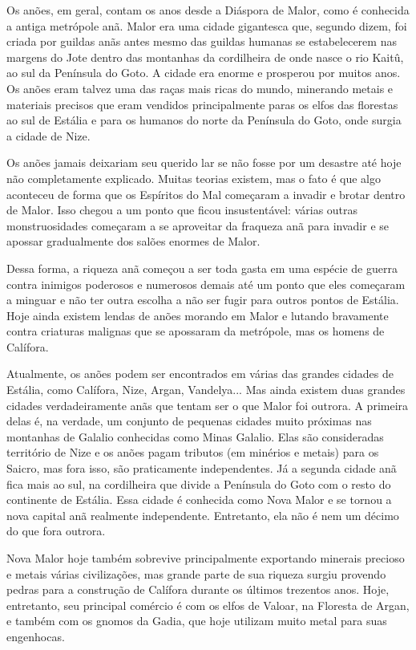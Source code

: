 \documentclass{RPG_Adventure}[2021/10/20]
\begin{document}
Os anões, em geral, contam os anos desde a Diáspora de Malor, como é conhecida a
antiga metrópole anã. Malor era uma cidade gigantesca que, segundo dizem, foi
criada por guildas anãs antes mesmo das guildas humanas se estabelecerem nas
margens do Jote dentro das montanhas da cordilheira de onde nasce o rio Kaitû,
ao sul da Península do Goto. A cidade era enorme e prosperou por muitos anos. Os
anões eram talvez uma das raças mais ricas do mundo, minerando metais e
materiais precisos que eram vendidos principalmente paras os elfos das florestas
ao sul de Estália e para os humanos do norte da Península do Goto, onde surgia a
cidade de Nize.

Os anões jamais deixariam seu querido lar se não fosse por um desastre até hoje
não completamente explicado. Muitas teorias existem, mas o fato é que algo
aconteceu de forma que os Espíritos do Mal começaram a invadir e brotar dentro
de Malor. Isso chegou a um ponto que ficou insustentável: várias outras
monstruosidades começaram a se aproveitar da fraqueza anã para invadir e se
apossar gradualmente dos salões enormes de Malor.

Dessa forma, a riqueza anã começou a ser toda gasta em uma espécie de guerra
contra inimigos poderosos e numerosos demais até um ponto que eles começaram a
minguar e não ter outra escolha a não ser fugir para outros pontos de Estália.
Hoje ainda existem lendas de anões morando em Malor e lutando bravamente contra
criaturas malignas que se apossaram da metrópole, mas os homens de Calífora.

Atualmente, os anões podem ser encontrados em várias das grandes cidades de
Estália, como Calífora, Nize, Argan, Vandelya... Mas ainda existem duas grandes
cidades verdadeiramente anãs que tentam ser o que Malor foi outrora. A primeira
delas é, na verdade, um conjunto de pequenas cidades muito próximas nas
montanhas de Galalio conhecidas como Minas Galalio. Elas são consideradas
território de Nize e os anões pagam tributos (em minérios e metais) para os
Saicro, mas fora isso, são praticamente independentes. Já a segunda cidade anã
fica mais ao sul, na cordilheira que divide a Península do Goto com o resto do
continente de Estália. Essa cidade é conhecida como Nova Malor e se tornou a
nova capital anã realmente independente. Entretanto, ela não é nem um décimo do
que fora outrora.

Nova Malor hoje também sobrevive principalmente exportando minerais precioso e
metais várias civilizações, mas grande parte de sua riqueza surgiu provendo
pedras para a construção de Calífora durante os últimos trezentos anos. Hoje,
entretanto, seu principal comércio é com os elfos de Valoar, na Floresta de
Argan, e também com os gnomos da Gadia, que hoje utilizam muito metal para suas
engenhocas.
\end{document}
